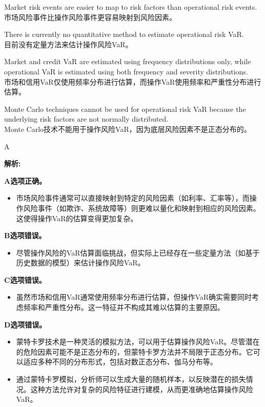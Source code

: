 \documentclass{article}
\newenvironment{explanation}
{\textbf{解析:}\par}
{\par}
\begin{document}
\begin{choices}
    \item Market risk events are easier to map to risk factors than operational risk events.\\
    市场风险事件比操作风险事件更容易映射到风险因素。
    \item There is currently no quantitative method to estimate operational risk VaR.\\
    目前没有定量方法来估计操作风险VaR。
    \item Market and credit VaR are estimated using frequency distributions only, while operational VaR is estimated using both frequency and severity distributions.\\
    市场和信用VaR仅使用频率分布进行估算，而操作VaR使用频率和严重性分布进行估算。
    \item Monte Carlo techniques cannot be used for operational risk VaR because the underlying risk factors are not normally distributed.\\
    Monte Carlo技术不能用于操作风险VaR，因为底层风险因素不是正态分布的。
\end{choices}

\begin{correctanswer}
    A
\end{correctanswer}

\begin{explanation}
    \textbf{A选项正确。} 
    \begin{itemize}
        \item 市场风险事件通常可以直接映射到特定的风险因素（如利率、汇率等），而操作风险事件（如欺诈、系统故障等）则更难以量化和映射到相应的风险因素。这使得操作VaR的估算变得更加复杂。
    \end{itemize}

    \textbf{B选项错误。} 
    \begin{itemize}
        \item 尽管操作风险的VaR估算面临挑战，但实际上已经存在一些定量方法（如基于历史数据的模型）来估计操作风险VaR。
    \end{itemize}

    \textbf{C选项错误。} 
    \begin{itemize}
        \item 虽然市场和信用VaR通常使用频率分布进行估算，但操作VaR确实需要同时考虑频率和严重性分布。这一特征并不构成其难以估算的主要原因。
    \end{itemize}

    \textbf{D选项错误。} 
    \begin{itemize}
        \item 蒙特卡罗技术是一种灵活的模拟方法，可以用于估算操作风险VaR。尽管潜在的危险因素可能不是正态分布的，但蒙特卡罗方法并不局限于正态分布。它可以适应多种不同的分布形式，包括对数正态分布、伽马分布等。
        \item 通过蒙特卡罗模拟，分析师可以生成大量的随机样本，以反映潜在的损失情况。这种方法允许对复杂的风险特征进行建模，从而更准确地估算操作风险VaR。
    \end{itemize}
\end{explanation}
\end{document}
